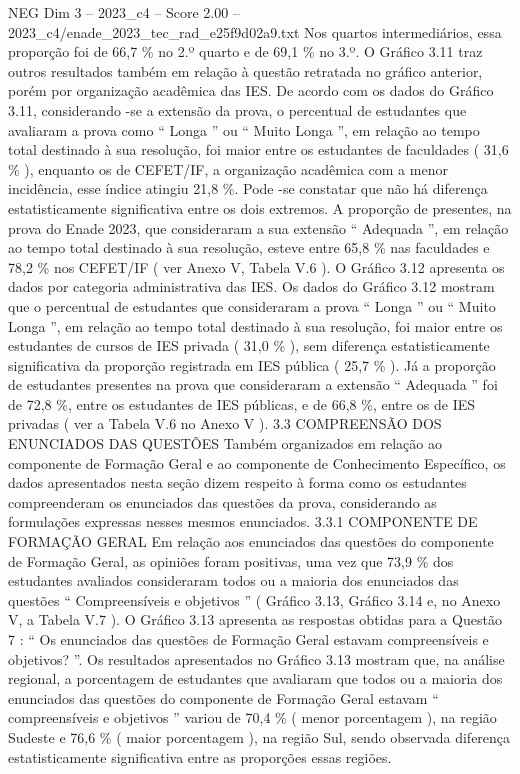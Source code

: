 \begin{textsample}{NEG Dim 3 – 2023\_c4 – Score 2.00 – 2023\_c4/enade\_2023\_tec\_rad\_e25f9d02a9.txt}
Nos quartos intermediários, essa proporção foi de 66,7 \% no 2.º quarto e de 69,1 \% no 3.º.
O Gráfico 3.11 traz outros resultados também em relação à questão retratada no gráfico anterior, porém por organização acadêmica das IES.
De acordo com os dados do Gráfico 3.11, considerando -se a extensão da prova, o percentual de estudantes que avaliaram a prova como “ Longa ” ou “ Muito Longa ”, em relação ao tempo total destinado à sua resolução, foi maior entre os estudantes de faculdades ( 31,6 \% ), enquanto os de CEFET/IF, a organização acadêmica com a menor incidência, esse índice atingiu 21,8 \%.
Pode -se constatar que não há diferença estatisticamente significativa entre os dois extremos.
A proporção de presentes, na prova do Enade 2023, que consideraram a sua extensão “ Adequada ”, em relação ao tempo total destinado à sua resolução, esteve entre 65,8 \% nas faculdades e 78,2 \% nos CEFET/IF ( ver Anexo V, Tabela V.6 ).
O Gráfico 3.12 apresenta os dados por categoria administrativa das IES.
Os dados do Gráfico 3.12 mostram que o percentual de estudantes que consideraram a prova “ Longa ” ou “ Muito Longa ”, em relação ao tempo total destinado à sua resolução, foi maior entre os estudantes de cursos de IES privada ( 31,0 \% ), sem diferença estatisticamente significativa da proporção registrada em IES pública ( 25,7 \% ).
Já a proporção de estudantes presentes na prova que consideraram a extensão “ Adequada ” foi de 72,8 \%, entre os estudantes de IES públicas, e de 66,8 \%, entre os de IES privadas ( ver a Tabela V.6 no Anexo V ). 3.3 COMPREENSÃO DOS ENUNCIADOS DAS QUESTÕES Também organizados em relação ao componente de Formação Geral e ao componente de Conhecimento Específico, os dados apresentados nesta seção dizem respeito à forma como os estudantes compreenderam os enunciados das questões da prova, considerando as formulações expressas nesses mesmos enunciados. 3.3.1 COMPONENTE DE FORMAÇÃO GERAL Em relação aos enunciados das questões do componente de Formação Geral, as opiniões foram positivas, uma vez que 73,9 \% dos estudantes avaliados consideraram todos ou a maioria dos enunciados das questões “ Compreensíveis e objetivos ” ( Gráfico 3.13, Gráfico 3.14 e, no Anexo V, a Tabela V.7 ).
O Gráfico 3.13 apresenta as respostas obtidas para a Questão 7 : “ Os enunciados das questões de Formação Geral estavam compreensíveis e objetivos? ”.
Os resultados apresentados no Gráfico 3.13 mostram que, na análise regional, a porcentagem de estudantes que avaliaram que todos ou a maioria dos enunciados das questões do componente de Formação Geral estavam “ compreensíveis e objetivos ” variou de 70,4 \% ( menor porcentagem ), na região Sudeste e 76,6 \% ( maior porcentagem ), na região Sul, sendo observada diferença estatisticamente significativa entre as proporções essas regiões.

\end{textsample}
